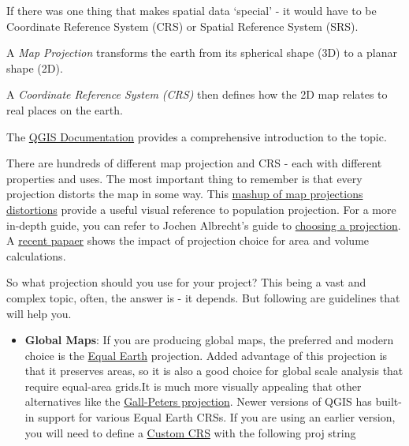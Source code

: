 \documentclass[
  12pt,
  a4paper]{article}
\providecommand{\tightlist}{%
  \setlength{\itemsep}{0pt}\setlength{\parskip}{0pt}}
\begin{document}
If there was one thing that makes spatial data `special' - it would have
to be Coordinate Reference System (CRS) or Spatial Reference System
(SRS).

A \emph{Map Projection} transforms the earth from its spherical shape
(3D) to a planar shape (2D).

A \emph{Coordinate Reference System (CRS)} then defines how the 2D map
relates to real places on the earth.

The
\href{https://docs.qgis.org/testing/en/docs/gentle_gis_introduction/coordinate_reference_systems.html}{QGIS
Documentation} provides a comprehensive introduction to the topic.

There are hundreds of different map projection and CRS - each with
different properties and uses. The most important thing to remember is
that every projection distorts the map in some way. This
\href{https://bl.ocks.org/syntagmatic/ba569633d51ebec6ec6e}{mashup of
map projections distortions} provide a useful visual reference to
population projection. For a more in-depth guide, you can refer to
Jochen Albrecht's guide to
\href{http://www.geo.hunter.cuny.edu/~jochen/gtech201/lectures/lec6concepts/map\%20coordinate\%20systems/how\%20to\%20choose\%20a\%20projection.htm}{choosing
a projection}. A
\href{https://onlinelibrary.wiley.com/doi/full/10.1111/tgis.12636}{recent
papaer} shows the impact of projection choice for area and volume
calculations.

So what projection should you use for your project? This being a vast
and complex topic, often, the answer is - it depends. But following are
guidelines that will help you.

\begin{itemize}
\tightlist
\item
  \textbf{Global Maps}: If you are producing global maps, the preferred
  and modern choice is the \href{http://equal-earth.com/}{Equal Earth}
  projection. Added advantage of this projection is that it preserves
  areas, so it is also a good choice for global scale analysis that
  require equal-area grids.It is much more visually appealing that other
  alternatives like the
  \href{https://en.wikipedia.org/wiki/Gall\%E2\%80\%93Peters_projection}{Gall-Peters
  projection}. Newer versions of QGIS has built-in support for various
  Equal Earth CRSs. If you are using an earlier version, you will need
  to define a
  \href{https://docs.qgis.org/testing/en/docs/user_manual/working_with_projections/working_with_projections.html\#custom-coordinate-reference-system}{Custom
  CRS} with the following proj string
\end{itemize}
\end{document}
